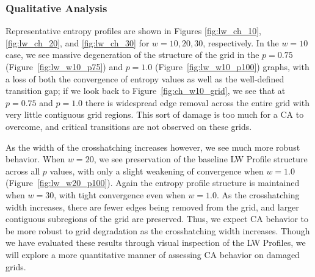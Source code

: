 \documentclass[a4paper,11pt]{article}
\begin{document}
\subsubsection*{Qualitative Analysis}

Representative entropy profiles are shown in Figures \ref{fig:lw_ch_10}, \ref{fig:lw_ch_20}, and \ref{fig:lw_ch_30} for \linebreak $w=10,20,30$, respectively. In the $w=10$ case, we see massive degeneration of the structure of the grid in the $p=0.75$ (Figure~\ref{fig:lw_w10_p75}) and $p=1.0$ (Figure~\ref{fig:lw_w10_p100}) graphs, with a loss of both the convergence of entropy values as well as the well-defined transition gap; if we look back to Figure~\ref{fig:ch_w10_grid}, we see that at $p=0.75$ and $p=1.0$ there is widespread edge removal across the entire grid with very little contiguous grid regions. This sort of damage is too much for a CA to overcome, and critical transitions are not observed on these grids. 

As the width of the crosshatching increases however, we see much more robust behavior. When $w=20$, we see preservation of the baseline LW Profile structure across all $p$ values, with only a slight weakening of convergence when $w=1.0$ (Figure~\ref{fig:lw_w20_p100}). Again the entropy profile structure is maintained when $w=30$, with tight convergence even when $w=1.0$. As the crosshatching width increases, there are fewer edges being removed from the grid, and larger contiguous subregions of the grid are preserved. Thus, we expect CA behavior to be more robust to grid degradation as the crosshatching width increases. Though we have evaluated these results through visual inspection of the LW Profiles, we will explore a more quantitative manner of assessing CA behavior on damaged grids.
\end{document}
